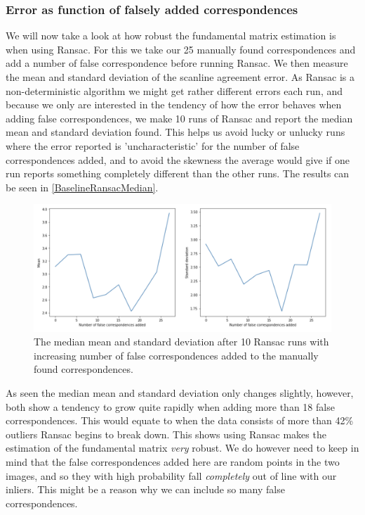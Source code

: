 \subsubsection{Error as function of falsely added correspondences}
We will now take a look at how robust the fundamental matrix estimation is when using Ransac. For this we take our 25 manually found correspondences and add a number of false correspondence before running Ransac. We then measure the mean and standard deviation of the scanline agreement error. As Ransac is a non-deterministic algorithm we might get rather different errors each run, and because we only are interested in the tendency of how the error behaves when adding false correspondences, we make 10 runs of Ransac and report the median mean and standard deviation found. This helps us avoid lucky or unlucky runs where the error reported is 'uncharacteristic' for the number of false correspondences added, and to avoid the skewness the average would give if one run reports something completely different than the other runs. The results can be seen in \autoref{BaselineRansacMedian}.

\begin{figure}[h]
	\centering
	\includegraphics[width=\linewidth]{Materials/BaselineRansacMedian}
	\caption{The median mean and standard deviation after 10 Ransac runs with increasing number of false correspondences added to the manually found correspondences.}
	\label{BaselineRansacMedian}
\end{figure}
As seen the median mean and standard deviation only changes slightly, however, both show a tendency to grow quite rapidly when adding more than 18 false correspondences. This would equate to when the data consists of more than 42\% outliers Ransac begins to break down. This shows using Ransac makes the estimation of the fundamental matrix \textit{very} robust. We do however need to keep in mind that the false correspondences added here are random points in the two images, and so they with high probability fall \textit{completely} out of line with our inliers. This might be a reason why we can include so many false correspondences.

